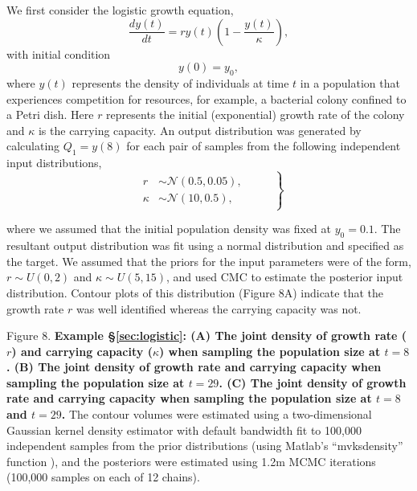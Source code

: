\documentclass[10pt,letterpaper]{article}
\begin{document}
We first consider the logistic growth equation,
%
\begin{equation}
\frac{dy(t)}{dt} = r y(t) \left( 1 - \frac{y(t)}{\kappa} \right),
\end{equation}
with initial condition
\begin{equation}
y(0)=y_0,
\end{equation}
%
where $y(t)$ represents the density of individuals at time $t$ in a population that experiences competition for resources, for example, a bacterial colony confined to a Petri dish. Here $r$ represents the initial (exponential) growth rate of the colony and $\kappa$ is the carrying capacity. An output distribution was generated by calculating $Q_1=y(8)$ for each pair of samples from the following independent input distributions,
%
\begin{equation}
\left .
\begin{gathered}\begin{aligned}
r&\sim \mathcal{N}\left(0.5,0.05\right),     \\
\kappa &\sim \mathcal{N}\left(10,0.5\right),
\end{aligned} \end{gathered}
\qquad \right\}
\end{equation}

%
\noindent
where we assumed that the initial population density was fixed at $y_0=0.1$. The resultant output distribution was fit using a normal distribution and specified as the target. We assumed that the priors for the input parameters were of the form, $r\sim U(0,2)$ and $\kappa\sim U(5,15)$, and used CMC to estimate the posterior input distribution. Contour plots of this distribution (Figure 8A) indicate that the growth rate $r$ was well identified whereas the carrying capacity was not.

\vspace{0.5cm}

Figure 8. {\bf Example \S \ref{sec:logistic}: (A) The joint density of growth rate ($r$) and carrying capacity ($\kappa$) when sampling the population size at $t=8$. (B) The joint density of  growth rate and carrying capacity when sampling the population size at $t=29$. (C)  The joint density of  growth rate and carrying capacity when sampling the population size at $t=8$ and $t=29$.} The contour volumes were estimated using a two-dimensional Gaussian kernel density estimator with default bandwidth fit to 100,000 independent samples from the prior distributions (using Matlab's ``mvksdensity'' function \cite{MATLAB:2016}), and the posteriors were estimated using 1.2m MCMC iterations (100,000 samples on each of 12 chains).
\end{document}
